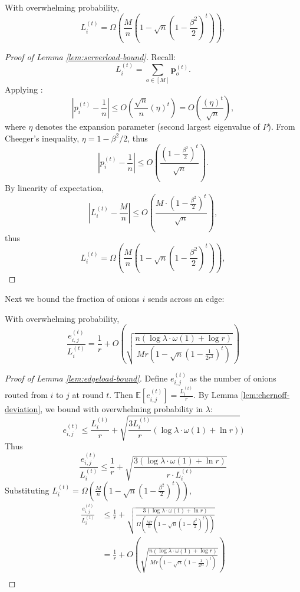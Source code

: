 \begin{lemma} \label{lem:serverload-bound}
    With overwhelming probability, 
    $$
    L^{(t)}_i = \Omega\left( \frac{M}{n} \left(1 - \sqrt{n} \left(1 - \frac{\beta^2}{2}\right)^t\right) \right),
    $$
\end{lemma}
\begin{proof}[Proof of Lemma \ref{lem:serverload-bound}]
Recall:
$$
L^{(t)}_i = \sum_{o \in [M]} \mathbf{p}^{(t)}_{o}.
$$
Applying \cite[Theorem 3.2]{Hoory2006}:
$$
\left| p^{(t)}_i - \frac{1}{n} \right| \leq O\left( \frac{\sqrt{n}}{n} (\eta)^t \right) = O\left( \frac{(\eta)^t}{\sqrt{n}} \right),
$$
where $\eta$ denotes the expansion parameter (second largest eigenvalue of $P$). From Cheeger's inequality, $\eta = 1-\beta^2 / 2$, thus
$$
\left| p^{(t)}_i - \frac{1}{n} \right| \leq O\left( \frac{(1 - \frac{\beta^2}{2})^t}{\sqrt{n}} \right).
$$
By linearity of expectation, 
$$
\left|L^{(t)}_i - \frac{M}{n}\right| \leq O\left( \frac{M \cdot (1 - \frac{\beta^2}{2})^t}{\sqrt{n}} \right),
$$
thus
$$
L^{(t)}_i = \Omega\left( \frac{M}{n} \left(1 - \sqrt{n} \left(1 - \frac{\beta^2}{2}\right)^t\right) \right),
$$

\end{proof}

Next we bound the fraction of onions $i$ sends across an edge:

\begin{lemma} \label{lem:edgeload-bound}
    With overwhelming probability, 
    $$
     \frac{e^{(t)}_{i,j}}{L^{(t)}_i} = \frac{1}{r} + O\left(\sqrt{\frac{n(\log \lambda \cdot \omega(1) + \log r)}{Mr \left(1 - \sqrt{n} \left(1 - \frac{1}{2r^2}\right)^t\right)}}\right)
    $$
\end{lemma}
\begin{proof}[Proof of Lemma \ref{lem:edgeload-bound}]

Define $e^{(t)}_{i,j}$ as the number of onions routed from $i$ to $j$ at round $t$. Then $\mathbb{E}[e^{(t)}_{i,j}] = \frac{L^{(t)}_i}{r}$. By Lemma \ref{lem:chernoff-deviation}, we bound with overwhelming probability in $\lambda$:
$$ 
e^{(t)}_{i,j} \leq \frac{L^{(t)}_i}{r} + \sqrt{\frac{3L^{(t)}_i}{r}(\log \lambda \cdot \omega(1) + \ln r)})
$$
Thus
$$ 
\frac{e^{(t)}_{i,j}}{L^{(t)}_i} \leq \frac{1}{r} + \sqrt{\frac{3(\log \lambda \cdot \omega(1) + \ln r)}{r \cdot L^{(t)}_i}}
$$
Substituting $L^{(t)}_i = \Omega\left( \frac{M}{n} \left(1 - \sqrt{n} \left(1 - \frac{\beta^2}{2}\right)^t\right) \right)$,
\begin{align*}
    \frac{e^{(t)}_{i,j}}{L^{(t)}_i} &\leq \frac{1}{r} + \sqrt{\frac{3(\log \lambda \cdot \omega(1) + \ln r)}{\Omega\left( \frac{Mr}{n} \left(1 - \sqrt{n} \left(1 - \frac{\beta^2}{2}\right)^t\right) \right)}}\\
    &= \frac{1}{r} + O\left(\sqrt{\frac{n(\log \lambda \cdot \omega(1) + \log r)}{Mr \left(1 - \sqrt{n} \left(1 - \frac{1}{2r^2}\right)^t\right)}}\right)\\
\end{align*}
\end{proof}


